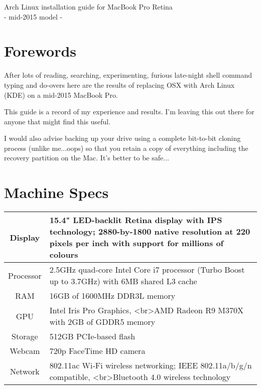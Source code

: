 
\color{dark}
\setlength{\parindent}{0em}
\setlength{\parskip}{0.5em}
\renewcommand{\baselinestretch}{1.2}


\centering
\LARGE
Arch Linux installation guide for MacBook Pro Retina\\
 - mid-2015 model - 
\normalsize\justify
\tableofcontents
\clearpage

\section{Forewords}

\noindent After lots of reading, searching, experimenting, furious late-night shell command typing and 
do-overs here are the results of replacing OSX with Arch Linux (KDE) on a mid-2015 MacBook Pro. 

\noindent This guide is a record of my experience and results. I'm leaving this out there for anyone that
might find this useful.

\noindent I would also advise backing up your drive using a complete bit-to-bit cloning process (unlike me...oops) so that you retain a copy of everything including the recovery partition on the Mac. 
It's better to be safe...

\section{Machine Specs}

\begin{tabular}{c|l}
	\hline
	Display   & 15.4" LED-backlit Retina display with IPS technology; 2880-by-1800 native resolution at 220 pixels per inch with support for millions of colours \\\hline
	Processor & 2.5GHz quad-core Intel Core i7 processor (Turbo Boost up to 3.7GHz) with 6MB shared L3 cache \\\hline
	RAM       & 16GB of 1600MHz DDR3L memory \\\hline
	GPU       & Intel Iris Pro Graphics, <br>AMD Radeon R9 M370X with 2GB of GDDR5 memory \\\hline
	Storage   & 512GB PCIe-based flash \\\hline
	Webcam    & 720p FaceTime HD camera \\\hline
	Network   & 802.11ac Wi‑Fi wireless networking; IEEE 802.11a/b/g/n compatible, <br>Bluetooth 4.0 wireless technology \\\hline
\end{tabular}

